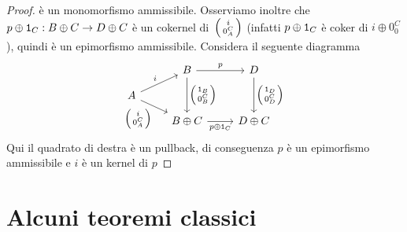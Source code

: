 \begin{proof}
  è un monomorfismo ammissibile. Osserviamo inoltre che \(p \oplus \mathtt 1_C : B
  \oplus C \to D \oplus C\) è un cokernel di~\(\begin{psmallmatrix} i \\
    0_A^C \end{psmallmatrix}\) (infatti \(p \oplus \mathtt 1_C\) è coker di \(i \oplus 0_0^C\)), quindi è un
  epimorfismo ammissibile. Considera il seguente diagramma
  \[
    \begin{tikzcd}[row sep=small, ampersand replacement=\&]
      \& B \ar["{\begin{psmallmatrix} \id_B \\
          0_B^C \end{psmallmatrix}}", dd]
      \ar["{p}", r] \& D \ar["{\begin{psmallmatrix} \id_D \\ 0_D^C \end{psmallmatrix}}", dd] \\
      A \ar["{i}", ur] \ar["{\begin{psmallmatrix} i \\ 0_A^C \end{psmallmatrix}}", dr, swap] \\
      \& B \oplus C \ar["{p \oplus \id_C}", r, swap] \& D \oplus C
    \end{tikzcd}
  \]
  Qui il quadrato di destra è un pullback, di conseguenza \(p\) è un
  epimorfismo ammissibile e \(i\) è un kernel di \(p\)
\end{proof}



\section{Alcuni teoremi classici}

